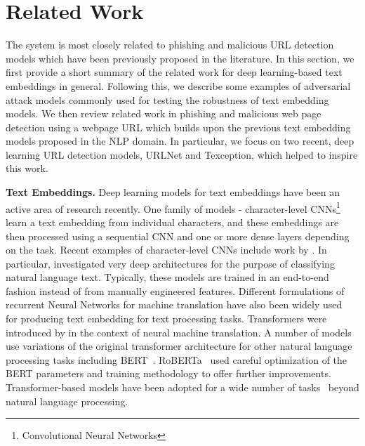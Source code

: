 \section{Related Work}
\label{sec:urltran:related}
%
The \URLTranSys system is most closely related to phishing and malicious URL detection models which have been previously proposed in the literature.
In this section, we first provide a short summary of the related work for deep learning-based text embeddings in general. 
Following this, we describe some examples of adversarial attack models commonly used for testing the robustness of text embedding models.
We then review related work in phishing and malicious web page detection using a webpage URL which builds upon the previous text embedding models proposed in the NLP domain. 
In particular, we focus on two recent, deep learning URL detection models, URLNet and Texception, which helped to inspire this work.

\noindent\textbf{Text Embeddings.}
Deep learning models for text embeddings have been an active area of research recently.
One family of models - character-level CNNs\footnote{Convolutional Neural Networks}  learn a text embedding from individual characters, and these embeddings are then processed using a sequential CNN and one or more dense layers depending on the task. 
Recent examples of character-level CNNs include work by \citet{conneau2017very,zhang2015character}.
In particular, \citet{conneau2017very} investigated very deep architectures for the purpose of classifying natural language text.
Typically, these models are trained in an end-to-end fashion instead of from manually engineered features.
Different formulations of recurrent Neural Networks for machine translation have also been  widely used~\citep{graves2013generating,hochreiter1997long,cho2014properties,bahdanau2015neural} for producing text embedding for text processing tasks.
Transformers were introduced by \citet{vaswani2017attention} in the context of neural machine translation.
A number of models use variations of the original transformer architecture for other natural language processing tasks including BERT~\citep{devlin2019bert,rogers2020primer}.%
RoBERTa~\citep{liu2019roberta} used careful optimization of the BERT parameters and training methodology to offer further improvements.
Transformer-based models have been adopted for a wide number of tasks~\citep{bommasani2021foundationmodels} beyond natural language processing.

